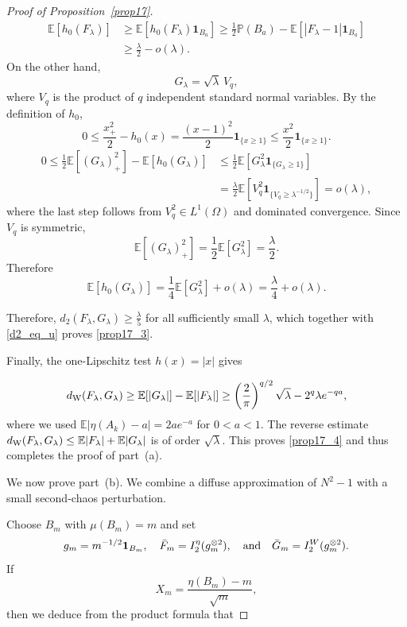 \documentclass[letterpaper,11pt,reqno]{amsart}
\numberwithin{equation}{section}
\theoremstyle{plain}
\theoremstyle{definition}
\theoremstyle{remark}
\newcommand{\E}{\mathbb{E}}
\newcommand{\PP}{\mathbb{P}}
\newcommand{\ind}{\mathbf{1}}
\newcommand{\noi}{\noindent}
\newcommand{\ot}{\otimes}
\newcommand{\dW}{d_{\rm W}}
\newcommand{\AND}{\quad{\rm and}\quad}
\begin{document}
\begin{proof}[Proof of Proposition~\ref{prop17}]
\noi
\begin{align*}
 \E[h_0(F_\lambda)]
 &\geq\E[h_0(F_\lambda)\ind_{B_a}]
 \geq\frac12\PP(B_a)-\E[|F_\lambda-1|\ind_{B_a}] \\
& \geq\frac{\lambda}{2}-o(\lambda).
\end{align*}
On the other hand,
\[
 G_\lambda=\sqrt{\lambda}\,V_q,
\]
where $V_q$ is the product of $q$ independent standard normal
variables.  By the definition of $h_0$,
\[
 0\leq
 \frac{x_+^2}{2}-h_0(x)
 =
 \frac{(x-1)^2}{2}\ind_{\{x\geq1\}}
 \leq
 \frac{x^2}{2}\ind_{\{x\geq1\}}.
\]
\[
\begin{aligned}
 0
 \leq
 \frac12\E[(G_\lambda)_+^2]
 -\E[h_0(G_\lambda)]
 &\leq \frac12 \E[G_\lambda^2\ind_{\{G_\lambda\geq1\}}]\\
 &=
 \frac{\lambda}{2}
 \E\left[
 V_q^2
 \ind_{\{V_q\geq\lambda^{-1/2}\}}
 \right]
 =
 o(\lambda),
\end{aligned}
\]
where the last step follows from $V_q^2\in L^1(\Omega)$ and dominated
convergence.  Since $V_q$ is symmetric,
\[
 \E[(G_\lambda)_+^2]
 =
 \frac12\E[G_\lambda^2]
 =
 \frac{\lambda}{2}.
\]
Therefore
\[
 \E[h_0(G_\lambda)]
 =
 \frac14\E[G_\lambda^2]+o(\lambda)
 =
 \frac{\lambda}{4}+o(\lambda).
\]


Therefore,
$d_2(F_\lambda,G_\lambda)\geq\frac{\lambda}{5}$
for all sufficiently small $\lambda$,
which together with \eqref{d2_eq_u} proves
\eqref{prop17_3}.

Finally, the one-Lipschitz test $h(x)=|x|$ gives

\noi
\begin{align*}
 \dW(F_\lambda,G_\lambda)
 \geq\E[|G_\lambda|]-\E[|F_\lambda|]
 \geq
 \left(\frac2\pi\right)^{q/2}\sqrt{\lambda}
 -2^q\lambda e^{-qa},
\end{align*}
where we used $\E|\eta(A_k)-a|=2ae^{-a}$
for $0<a<1$.
The reverse estimate
$ \dW(F_\lambda,G_\lambda)
 \leq\E|F_\lambda|+\E|G_\lambda|$
is of order $\sqrt{\lambda}$.  This proves
\eqref{prop17_4} and thus completes the proof of part~\textup{(a)}.

\medskip


We now prove part~\textup{(b)}.  We combine a diffuse approximation
of $N^2-1$ with a small second-chaos perturbation.

Choose $B_m$ with $\mu(B_m)=m$ and set
\noi
\begin{align*}
 g_m=m^{-1/2}\ind_{B_m},
 \quad
 \bar F_m=I_2^\eta(g_m^{\ot2}),
 \AND
 \bar G_m=I_2^W(g_m^{\ot2}).
\end{align*}
If
\[
 X_m=\frac{\eta(B_m)-m}{\sqrt m},
\]
then we deduce from the product formula that


\end{proof}
\end{document}
